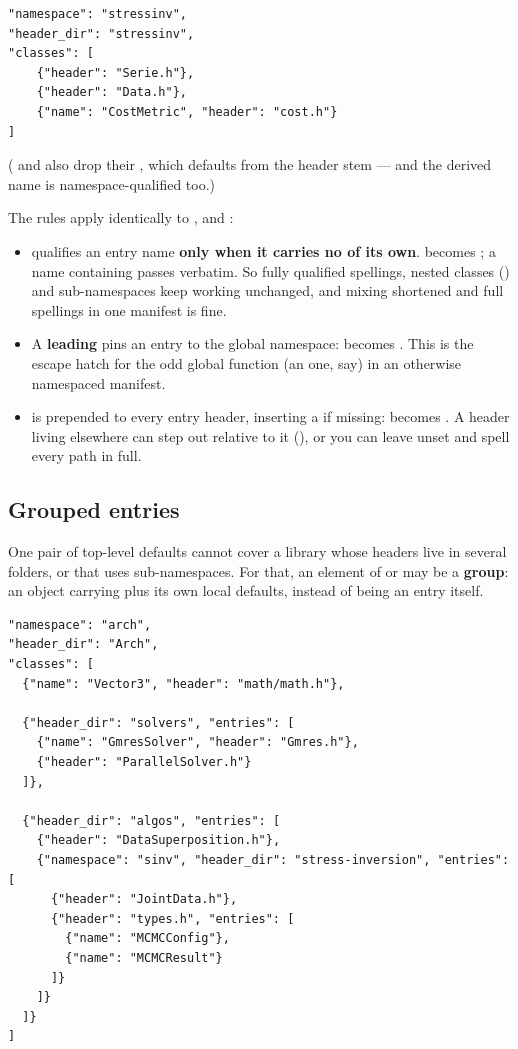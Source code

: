 \begin{lstlisting}[style=json]
"namespace": "stressinv",
"header_dir": "stressinv",
"classes": [
    {"header": "Serie.h"},
    {"header": "Data.h"},
    {"name": "CostMetric", "header": "cost.h"}
]
\end{lstlisting}

( and  also drop their , which defaults from
the header stem --- and the derived name is namespace-qualified too.)

The rules apply identically to ,  and
:

\begin{itemize}
  \item {} qualifies an entry name \textbf{only when it carries
    no \code{::} of its own}.  becomes ;
    a name containing \code{::} passes verbatim. So fully qualified spellings,
    nested classes () and sub-namespaces keep
    working unchanged, and mixing shortened and full spellings in one manifest
    is fine.
  \item A \textbf{leading \code{::}} pins an entry to the global namespace:
     becomes . This is the escape hatch for
    the odd global function (an  one, say) in an otherwise
    namespaced manifest.
  \item {} is prepended to every entry header, inserting a
    \code{/} if missing:  becomes
    . A header living elsewhere can step out relative to
    it (), or you can leave  unset and
    spell every path in full.
\end{itemize}

\subsection{Grouped entries}
\label{sec:groups}

One pair of top-level defaults cannot cover a library whose headers live in
several folders, or that uses sub-namespaces. For that, an element of
 or  may be a \textbf{group}: an object
carrying  plus its own local defaults, instead of being an entry
itself.

\begin{lstlisting}[style=json]
"namespace": "arch",
"header_dir": "Arch",
"classes": [
  {"name": "Vector3", "header": "math/math.h"},

  {"header_dir": "solvers", "entries": [
    {"name": "GmresSolver", "header": "Gmres.h"},
    {"header": "ParallelSolver.h"}
  ]},

  {"header_dir": "algos", "entries": [
    {"header": "DataSuperposition.h"},
    {"namespace": "sinv", "header_dir": "stress-inversion", "entries": [
      {"header": "JointData.h"},
      {"header": "types.h", "entries": [
        {"name": "MCMCConfig"},
        {"name": "MCMCResult"}
      ]}
    ]}
  ]}
]
\end{lstlisting}

